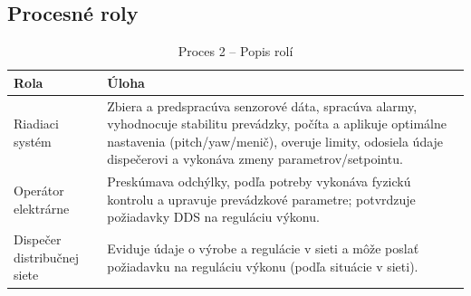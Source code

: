 \documentclass[12pt,a4paper]{article}
\begin{document}
\subsection{Procesné roly}
\begin{table}[H]
  \centering
  \renewcommand{\arraystretch}{1.2}
  \begin{tabularx}{\textwidth}{|p{}|X|}
    \hline
    \textbf{Rola} & \textbf{Úloha} \\
    \hline
    Riadiaci systém & Zbiera a predspracúva senzorové dáta, spracúva alarmy, vyhodnocuje stabilitu prevádzky, počíta a aplikuje optimálne nastavenia (pitch/yaw/menič), overuje limity, odosiela údaje dispečerovi a vykonáva zmeny parametrov/setpointu. \\
    \hline
    Operátor elektrárne & Preskúmava odchýlky, podľa potreby vykonáva fyzickú kontrolu a upravuje prevádzkové parametre; potvrdzuje požiadavky DDS na reguláciu výkonu. \\
    \hline
    Dispečer distribučnej siete & Eviduje údaje o výrobe a regulácie v sieti a môže poslať požiadavku na reguláciu výkonu (podľa situácie v sieti). \\
    \hline
  \end{tabularx}
  \caption{Proces 2 -- Popis rolí}
\end{table}
\end{document}
